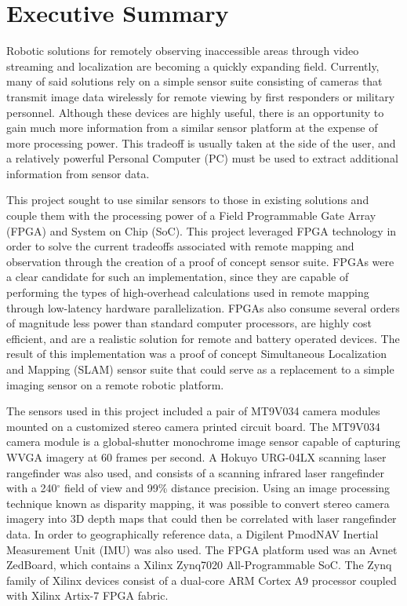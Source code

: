 {}
\section*{Executive Summary}

Robotic solutions for remotely observing inaccessible areas through video streaming and localization are becoming a quickly expanding field. Currently, many of said solutions rely on a simple sensor suite consisting of cameras that transmit image data wirelessly for remote viewing by first responders or military personnel. Although these devices are highly useful, there is an opportunity to gain much more information from a similar sensor platform at the expense of more processing power. This tradeoff is usually taken at the side of the user, and a relatively powerful Personal Computer (PC) must be used to extract additional information from sensor data. 
\par
This project sought to use similar sensors to those in existing solutions and couple them with the processing power of a Field Programmable Gate Array (FPGA) and System on Chip (SoC). This project leveraged FPGA technology in order to solve the current tradeoffs associated with remote mapping and observation through the creation of a proof of concept sensor suite. FPGAs were a clear candidate for such an implementation, since they are capable of performing the types of high-overhead calculations used in remote mapping through low-latency hardware parallelization. FPGAs also consume several orders of magnitude less power than standard computer processors, are highly cost efficient, and are a realistic solution for remote and battery operated devices. The result of this implementation was a proof of concept Simultaneous Localization and Mapping (SLAM) sensor suite that could serve as a replacement to a simple imaging sensor on a remote robotic platform. 
\par
The sensors used in this project included a pair of MT9V034 camera modules mounted on a customized stereo camera printed circuit board. The MT9V034 camera module is a global-shutter monochrome image sensor capable of capturing WVGA imagery at 60 frames per second. A Hokuyo URG-04LX scanning laser rangefinder was also used, and consists of a scanning infrared laser rangefinder with a 240$^\circ$ field of view and 99\% distance precision. Using an image processing technique known as disparity mapping, it was possible to convert stereo camera imagery into 3D depth maps that could then be correlated with laser rangefinder data. In order to geographically reference data, a Digilent PmodNAV Inertial Measurement Unit (IMU) was also used. The FPGA platform used was an Avnet ZedBoard, which contains a Xilinx Zynq7020 All-Programmable SoC. The Zynq family of Xilinx devices consist of a dual-core ARM Cortex A9 processor coupled with Xilinx Artix-7 FPGA fabric.
